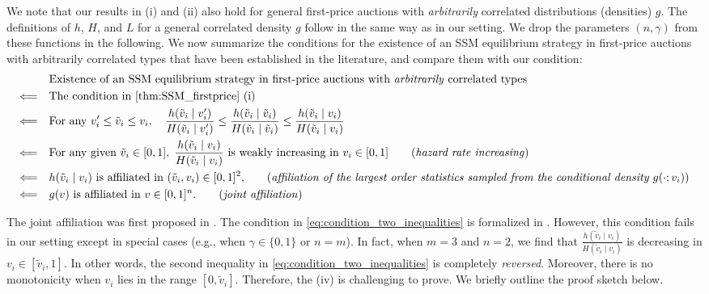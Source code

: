 We note that our results in  (i) and (ii) also hold for general first-price auctions with \textit{arbitrarily} correlated distributions (densities) $g$. The definitions of $h$, $H$, and $L$ for a general correlated density $g$ follow in the same way as in our setting.
We drop the parameters $(n,\gamma)$ from these functions in the following.
We now summarize the conditions for the existence of an SSM equilibrium strategy in first-price auctions with arbitrarily correlated types that have been established in the literature, and compare them with our condition:
\begin{align}
  \quad & \textrm{Existence of an SSM equilibrium strategy in first-price auctions with \textit{arbitrarily} correlated types} \nonumber \\
\Longleftarrow \quad &\textrm{The condition in \Cref{thm:SSM_firstprice} (i)} \nonumber\\
\Longleftarrow \quad & \textrm{For any } v_i^\prime \leq \tilde{v}_i \leq v_i,\quad  \frac{h(\tilde{v}_i\mid v_i^\prime)}{H(\tilde{v}_i\mid v_i^\prime)} 
\leq \frac{h(\tilde{v}_i\mid \tilde{v}_i)}{H(\tilde{v}_i\mid \tilde{v}_i)} 
\leq 
 \frac{h(\tilde{v}_i\mid v_i)}{H(\tilde{v}_i\mid v_i)} \label{eq:condition_two_inequalities}\\
\Longleftarrow \quad & \textrm{For any given } \tilde{v}_i \in [0,1],\; \frac{h(\tilde{v}_i\mid v_i)}{H(\tilde{v}_i\mid v_i)} \textrm{ is weakly increasing in } v_i \in [0,1] \tag{\textit{hazard rate increasing}}\\
\Longleftarrow \quad & 
\textrm{$h(\tilde{v}_i\mid v_i)$ is affiliated in $(\tilde{v}_i,v_i) \in [0,1]^2$,} \tag{\textit{affiliation of the largest order statistics sampled from the conditional density $g(\cdot;v_i)$}} \\
\Longleftarrow \quad & 
\textrm{$g(v)$ is affiliated in $v \in [0,1]^n$.} \tag{\textit{joint affiliation}}  
\end{align}

The joint affiliation was first proposed in \citet{milgrom_1982_auctiontheory_competitive_bidding}. The condition in \eqref{eq:condition_two_inequalities} is formalized in \citet{castro_2007_affiliation_positive_dependence}. However, this condition fails in our setting except in special cases (e.g., when $\gamma\in \{0,1\}$ or $n=m$). In fact, when $m=3$ and $n=2$, we find that $\frac{h(\tilde{v}_i \mid v_i)}{H(\tilde{v}_i\mid v_i)}$ is decreasing in $v_i\in [\tilde{v}_i,1]$. In other words, the second inequality in \eqref{eq:condition_two_inequalities} is completely \textit{reversed}. Moreover, there is no monotonicity when $v_i$ lies in the range $[0,\tilde{v}_i]$. Therefore, the  (iv) is challenging to prove. We briefly outline the proof sketch below.

